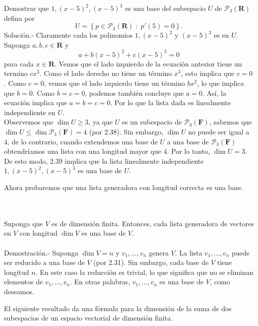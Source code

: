 \begin{myejem}
    Demostrar que $1,(x-5)^2,(x-5)^3$ es una base del subespacio $U$ de $\mathcal{P}_3(\textbf{R})$ defina por
    $$U=\left\{p\in \mathcal{P}_3(\textbf{R})\; : \; p'(5)=0\right\}.$$
	Solución.-\; Claramente cada los polinomios $1,(x-5)^2$ y $(x-5)^3$ es en $U$. Suponga $a,b,c \in \textbf{R}$ y 
	$$a+b(x-5)^2+c(x-5)^3=0$$
	para cada $x\in \textbf{R}.$ Vemos que el lado izquierdo de la ecuación anterior tiene un termino $cx^3$. Como el lado derecho no tiene un término $x^3$, esto implica que $c = 0$. Como $c = 0$, vemos que el lado izquierdo tiene un término $bx^2$, lo que implica que $b = 0$. Como $b = c = 0$, podemos también concluye que $a = 0$. Así, la ecuación implica que $a=b=c=0$. Por lo que la lista dada es linealmente independiente en $U$.\\

	Observemos que $\dim U\geq 3$, ya que $U$ es un subespacio de $\mathcal{P}_3(\textbf{F})$, sabemos que $\dim U \leq \dim \mathcal{P}_3(\textbf{F})=4$ (por 2.38). Sin embargo, $\dim U$ no puede ser igual a $4$, de lo contrario, cuando extendemos una base de $U$ a una base de $\mathcal{P}_3(\textbf{F})$ obtendríamos una lista con una longitud mayor que $4$. Por lo tanto, $\dim U = 3$. De esto modo, 2.39 implica que la lista linealmente independiente $1,(x-5)^2,(x-5)^3$ es una base de $U$.
\end{myejem}

Ahora probaremos que una lista generadora con longitud correcta es una base.

\begin{myteo}\,\\\\
	Suponga que $V$ es de dimensión finita. Entonces, cada lista generadora de vectores en $V$ con longitud $\dim V$ es una base de $V$.\\\\
	    Demostración.-\; Suponga $\dim V=n$ y $v_1,\ldots,v_n$ genera $V$. La lista $v_1,\ldots,v_n$ puede ser reducido a una base de $V$ (por 2.31). Sin embargo, cada base de $V$ tiene longitud $n$. En este caso la reducción es trivial, lo que significa que no se eliminan elementos de $v_1,\ldots,v_n$. En otras palabras, $v_1,\ldots,v_n$ es una base de $V$, como deseamos.
\end{myteo}

El siguiente resultado da una fórmula para la dimensión de la suma de dos subespacios de un espacio vectorial de dimensión finita.

